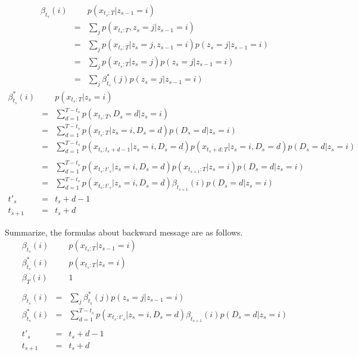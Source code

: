 \documentclass[a4paper]{article}
\DeclareMathOperator{\defeq}{\ensuremath{\stackrel{\mathrm{def}}{=}}}
\begin{document}
	\begin{eqnarray}
		\beta_{t_s}(i)
		&\defeq&
		p(x_{t_s:T} | z_{s-1} = i) \\
		&=&
		\sum_{j}{p(x_{t_s:T}, z_s = j | z_{s-1} = i)} \\
		&=&
		\sum_{j}{p(x_{t_s:T} | z_s = j, z_{s-1} = i) p(z_s = j | z_{s-1} = i)} \\
		&=&
		\sum_{j}{p(x_{t_s:T} | z_s = j) p(z_s = j | z_{s-1} = i)} \\
		&=&
		\sum_{j}{\beta_{t_s}^{*}(j) p(z_s = j | z_{s-1} = i)}
	\end{eqnarray}
	\begin{eqnarray}
		\beta_{t_s}^{*}(i)
		&\defeq&
		p(x_{t_s:T} | z_s = i) \\
		&=&
		\sum_{d=1}^{T-t_s}{p(x_{t_s:T}, D_s = d | z_s = i)} \\
		&=&
		\sum_{d=1}^{T-t_s}{p(x_{t_s:T} | z_s = i, D_s = d) p(D_s = d  | z_s = i)} \\
		&=&
		\sum_{d=1}^{T-t_s}{p(x_{t_s:t_s+d-1} | z_s = i, D_s = d) p(x_{t_s+d:T} | z_s = i, D_s = d) p(D_s = d  | z_s = i)} \nonumber \\ \\
		&=&
		\sum_{d=1}^{T-t_s}{p(x_{t_s:t'_s} | z_s = i, D_s = d) p(x_{t_{s+1}:T} | z_s = i) p(D_s = d  | z_s = i)} \\
		&=&
		\sum_{d=1}^{T-t_s}{p(x_{t_s:t'_s} | z_s = i, D_s = d) \beta_{t_{s+1}}(i) p(D_s = d  | z_s = i)}\\
	t'_s &=& t_s + d - 1 \\
	t_{s+1} &=& t_s + d
	\end{eqnarray}
	
	Summarize, the formulas about backward message are as follows.
	\begin{eqnarray}
		\beta_{t_s}(i)
		&\defeq&
		p(x_{t_s:T} | z_{s-1} = i) \\
		\beta_{t_s}^{*}(i)
		&\defeq&
		p(x_{t_s:T} | z_s = i) \\
		\beta_{T}(i)
		&\defeq&
		1 \\
		\nonumber \\
		\beta_{t_s}(i)
		&=&
		\sum_{j}{\beta_{t_s}^{*}(j) p(z_s = j | z_{s-1} = i)} \\
		\beta_{t_s}^{*}(i)
		&=&
		\sum_{d=1}^{T-t_s}{p(x_{t_s:t'_s} | z_s = i, D_s = d) \beta_{t_{s+1}}(i) p(D_s = d  | z_s = i)} \\
		\nonumber \\
		t'_s &=& t_s + d - 1 \\
		t_{s+1} &=& t_s + d	
	\end{eqnarray}
\end{document}
